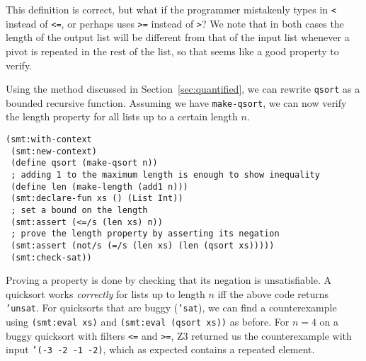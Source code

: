 This definition is correct, but what if the programmer mistakenly types in
\texttt{<} instead of \texttt{<=}, or perhaps uses \texttt{>=} instead of
\texttt{>}? We note that in both cases the length of the output list will be
different from that of the input list whenever a pivot is repeated in the rest
of the list, so that seems like a good property to verify.

Using the method discussed in Section~\ref{sec:quantified}, we can rewrite
\texttt{qsort} as a bounded recursive function. Assuming we have \texttt
{make-qsort}, we can now verify the length property for all lists up to a
certain length $n$.

\begin{verbatim}
(smt:with-context
 (smt:new-context)
 (define qsort (make-qsort n))
 ; adding 1 to the maximum length is enough to show inequality
 (define len (make-length (add1 n)))
 (smt:declare-fun xs () (List Int))
 ; set a bound on the length
 (smt:assert (<=/s (len xs) n))
 ; prove the length property by asserting its negation
 (smt:assert (not/s (=/s (len xs) (len (qsort xs)))))
 (smt:check-sat))
\end{verbatim}

Proving a property is done by checking that its negation is unsatisfiable. A
quicksort works \textit{correctly} for lists up to length $n$ iff the above
code returns \texttt{'unsat}. For quicksorts that are buggy (\texttt{'sat}),
we can find a counterexample using \texttt{(smt:eval xs)} and
\texttt{(smt:eval (qsort xs))} as before. For $n=4$ on a buggy quicksort with
filters \texttt{<=} and \texttt{>=}, Z3 returned us the counterexample with
input \texttt{'(-3 -2 -1 -2)}, which as expected contains a repeated element.
